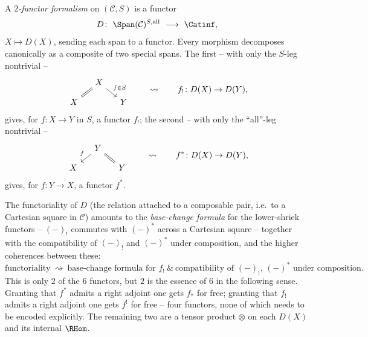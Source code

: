\begin{definition}
\label{def:17:2ff}
A \emph{$2$-functor formalism} on $(\mathcal C,S)$ is a functor
\begin{equation}
\label{eq:17:2ff}
D\colon\ \Span(\mathcal C)^{S,\mathrm{all}}\ \longrightarrow\ \Catinf,
\end{equation}
$X\mapsto D(X)$, sending each span to a functor. Every morphism decomposes canonically as
a composite of two special spans. The first -- with only the $S$-leg nontrivial --
\begin{equation}
\label{eq:17:2ff-shriek}
\begin{tikzcd}[column sep=small, row sep=small]
& X \arrow[dl, equal] \arrow[dr, "f\in S"] & \\
X & & Y
\end{tikzcd}
\qquad\rightsquigarrow\qquad f_{!}\colon D(X)\to D(Y),
\end{equation}
gives, for $f\colon X\to Y$ in $S$, a functor $f_{!}$; the second -- with only the
``all''-leg nontrivial --
\begin{equation}
\label{eq:17:2ff-star}
\begin{tikzcd}[column sep=small, row sep=small]
& Y \arrow[dl, "f"'] \arrow[dr, equal] & \\
X & & Y
\end{tikzcd}
\qquad\rightsquigarrow\qquad f^{*}\colon D(X)\to D(Y),
\end{equation}
gives, for $f\colon Y\to X$, a functor $f^{*}$.
\end{definition}

\begin{remark}
\label{rmk:17:two-of-six}
The functoriality of $D$ (the relation attached to a composable pair, i.e.\ to a Cartesian
square in $\mathcal C$) amounts to the \emph{base-change formula} for the lower-shriek
functors -- $(-)_{!}$ commutes with $(-)^{*}$ across a Cartesian square -- together with the
compatibility of $(-)_{!}$ and $(-)^{*}$ under composition, and the higher coherences
between these:
\begin{equation*}
\text{functoriality}\ \rightsquigarrow\ \text{base-change formula for }f_{!}\ \&\
\text{compatibility of }(-)_{!},\,(-)^{*}\text{ under composition.}
\end{equation*}
This is only $2$ of the $6$ functors, but $2$ is the essence of $6$ in the following sense.
Granting that $f^{*}$ admits a right adjoint one gets $f_{*}$ for free; granting that
$f_{!}$ admits a right adjoint one gets $f^{!}$ for free -- four functors, none of which
needs to be encoded explicitly. The remaining two are a tensor product $\otimes$ on each
$D(X)$ and its internal $\RHom$.
\end{remark}


